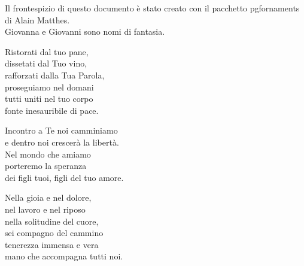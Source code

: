 \documentclass[11pt]{book}
\begin{document}
\begin{flushleft}
{\footnotesize Il frontespizio di questo documento è stato creato con il pacchetto \textsf{pgfornaments} di Alain Matthes.\\ Giovanna e Giovanni sono nomi di fantasia.}
\end{flushleft}
\clearpage
\settowidth{\versewidth}{Ristorati dal tuo pane,}
\begin{canzone}%
Ristorati dal tuo pane,\\
dissetati dal Tuo vino,\\
rafforzati dalla Tua Parola,\\
proseguiamo nel domani\\
tutti uniti nel tuo corpo\\
fonte inesauribile di pace.

\begin{ritornello}
Incontro a Te noi camminiamo\\
e dentro noi crescerà la libertà.\\
Nel mondo che amiamo\\
porteremo la speranza\\
dei figli tuoi, figli del tuo amore.%
\end{ritornello}

Nella gioia e nel dolore,\\
nel lavoro e nel riposo\\
nella solitudine del cuore,\\
sei compagno del cammino\\
tenerezza immensa e vera\\
mano che accompagna tutti noi.
\end{canzone}
\introduzione

\membatt
\end{document}
